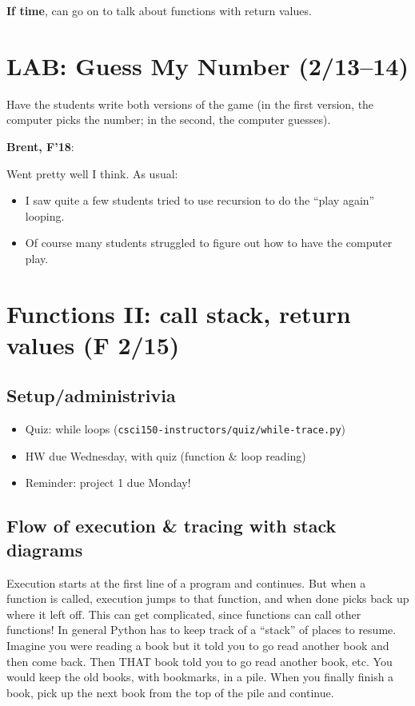 \documentclass{article}
\newenvironment{reflect}[1]
{
  \noindent
  \begin{lrbox}{\reflectbox}
    \begin{minipage}[t]{\textwidth}
      \textbf{#1}:
}{
    \end{minipage}
  \end{lrbox}
  \fbox{\usebox{\reflectbox}}
}
\newcommand{\ready}{\textcolor{Green}{\Checkmark}\xspace}
\begin{document}
\textbf{If time}, can go on to talk about functions with return
values.

\newpage
\section*{\ready LAB: Guess My Number (2/13--14)}

Have the students write both versions of the game (in the first
version, the computer picks the number; in the second, the computer
guesses).

\begin{reflect}{Brent, F'18}
  Went pretty well I think.  As usual:
  \begin{itemize}
  \item I saw quite a few students tried to use recursion to do the
    ``play again'' looping.
  \item Of course many students struggled to figure out how to have
    the computer play.
  \end{itemize}
\end{reflect}

\newpage
\section{\ready Functions II: call stack, return values (F 2/15)}


\subsection*{Setup/administrivia}

\begin{itemize}
\item \ready Quiz: while loops
  (\texttt{csci150-instructors/quiz/while-trace.py})
\item \ready HW due Wednesday, with quiz (function \& loop reading)
\item Reminder: project 1 due Monday!
\end{itemize}

\subsection*{Flow of execution \& tracing with stack diagrams}

Execution starts at the first line of a program and continues.  But
when a function is called, execution jumps to that function, and when
done picks back up where it left off.  This can get complicated, since
functions can call other functions!  In general Python has to keep
track of a ``stack'' of places to resume.  Imagine you were reading a
book but it told you to go read another book and then come back.  Then
THAT book told you to go read another book, etc.  You would keep the
old books, with bookmarks, in a pile.  When you finally finish a book,
pick up the next book from the top of the pile and continue.
\end{document}

